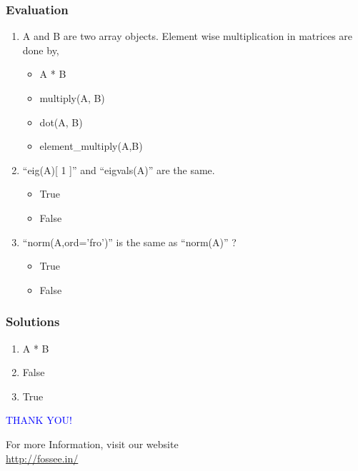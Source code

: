 \documentclass[presentation]{beamer}
\begin{document}
\begin{frame}
\frametitle{Evaluation}
\label{sec-12}


\begin{enumerate}
\item A and B are two array objects. Element wise multiplication in
   matrices are done by,
\begin{itemize}
\item A * B
\item multiply(A, B)
\item dot(A, B)
\item element\_multiply(A,B)
\end{itemize}
\vspace{5pt}
\item ``eig(A)[ 1 ]'' and ``eigvals(A)'' are the same.
\begin{itemize}
\item True
\item False
\end{itemize}
\vspace{5pt}
\item ``norm(A,ord='fro')'' is the same as ``norm(A)'' ?
\begin{itemize}
\item True
\item False
\end{itemize}
\end{enumerate}
\end{frame}
\begin{frame}
\frametitle{Solutions}
\label{sec-13}


\begin{enumerate}
\item A * B
\vspace{12pt}
\item False
\vspace{12pt}
\item True
\end{enumerate}
\end{frame}
\begin{frame}

  \begin{block}{}
  \begin{center}
  \textcolor{blue}{\Large THANK YOU!} 
  \end{center}
  \end{block}
\begin{block}{}
  \begin{center}
    For more Information, visit our website\\
    \url{http://fossee.in/}
  \end{center}  
  \end{block}
\end{frame}
\end{document}
